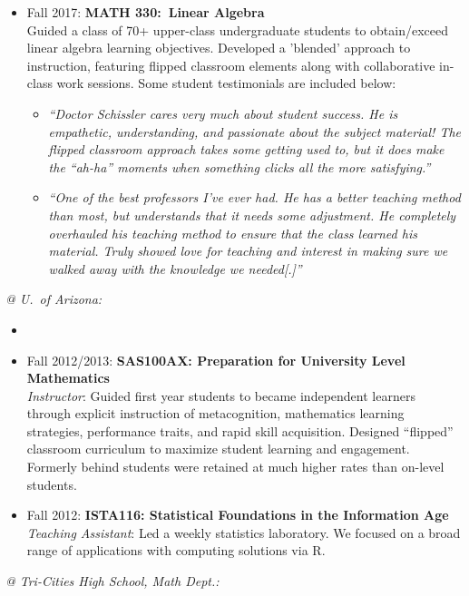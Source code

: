 \documentclass[paper=a4,fontsize=11pt]{scrartcl} %
\newcommand{\CourseEntry}[3]{
		\noindent \item{#1: \textbf{#2} \\ #3}}
\begin{document}
\begin{itemize}[noitemsep]
\CourseEntry{Fall 2017}{MATH 330:~Linear Algebra}{Guided a class of 70+ upper-class undergraduate students to obtain/exceed linear algebra learning objectives. Developed a 'blended' approach to instruction, featuring flipped classroom elements along with collaborative in-class work sessions. Some student testimonials are included below:
\begin{itemize}
\item \emph{\small{``Doctor Schissler cares very much about student success. He is empathetic, understanding, and passionate about the subject material! The flipped classroom approach takes some getting used to, but it does make the ``ah-ha'' moments when something clicks all the more satisfying.''}}
\item \emph{\small{``One of the best professors I've ever had. He has a better teaching method than most, but understands that it needs some adjustment.
He completely overhauled his teaching method to ensure that the class learned his material. Truly showed love for teaching and interest in making sure we walked away with the knowledge we needed[.]''}}
\end{itemize}
}{}

\end{itemize}


\noindent\textit{@ U.~of Arizona:}
\begin{itemize}[noitemsep]
\item[]
\vspace{-15pt}

\CourseEntry{Fall 2012/2013}{SAS100AX: Preparation for University Level Mathematics}{\textit{Instructor}: Guided first year students to became independent learners through explicit instruction of metacognition, mathematics learning strategies, performance traits, and rapid skill acquisition. Designed ``flipped'' classroom curriculum to maximize student learning and engagement. Formerly behind students were retained at much higher rates than on-level students.}
\CourseEntry{Fall 2012}{ISTA116: Statistical Foundations in the Information Age}{\textit{Teaching Assistant}: Led a weekly statistics laboratory. We focused on a broad range of applications with computing solutions via \textsc{R}.}

\end{itemize}

\noindent\textit{@ Tri-Cities High School, Math Dept.:}
\end{document}
